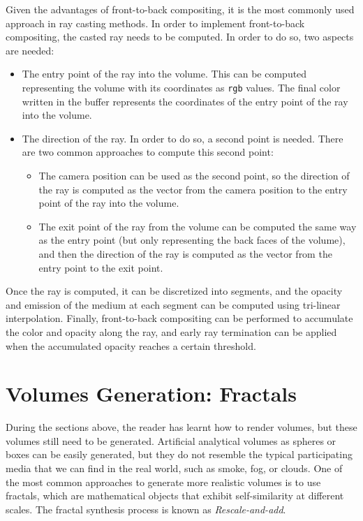 Given the advantages of front-to-back compositing, it is the most commonly used approach in ray casting methods. In order to implement front-to-back compositing, the casted ray needs to be computed. In order to do so, two aspects are needed:
\begin{itemize}
    \item The entry point of the ray into the volume. This can be computed representing the volume with its coordinates as \texttt{rgb} values. The final color written in the buffer represents the coordinates of the entry point of the ray into the volume.
    \item The direction of the ray. In order to do so, a second point is needed. There are two common approaches to compute this second point:
    \begin{itemize}
        \item The camera position can be used as the second point, so the direction of the ray is computed as the vector from the camera position to the entry point of the ray into the volume.
        \item The exit point of the ray from the volume can be computed the same way as the entry point (but only representing the back faces of the volume), and then the direction of the ray is computed as the vector from the entry point to the exit point.
    \end{itemize}
\end{itemize}

Once the ray is computed, it can be discretized into segments, and the opacity and emission of the medium at each segment can be computed using tri-linear interpolation. Finally, front-to-back compositing can be performed to accumulate the color and opacity along the ray, and early ray termination can be applied when the accumulated opacity reaches a certain threshold.

\section{Volumes Generation: Fractals}

During the sections above, the reader has learnt how to render volumes, but these volumes still need to be generated. Artificial analytical volumes as spheres or boxes can be easily generated, but they do not resemble the typical participating media that we can find in the real world, such as smoke, fog, or clouds. One of the most common approaches to generate more realistic volumes is to use fractals, which are mathematical objects that exhibit self-similarity at different scales. The fractal synthesis process is known as \emph{Rescale-and-add}.

